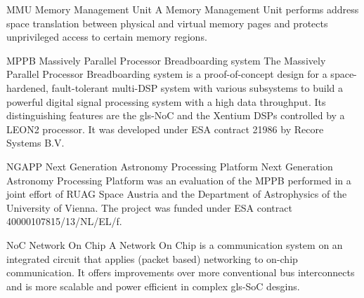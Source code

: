 


%
  {MMU}%
  {Memory Management Unit}%
  {A Memory Management Unit performs address space translation between physical
   and virtual memory pages and protects unprivileged access to certain memory
   regions.}%

%
  {MPPB}%
  {Massively Parallel Processor Breadboarding system}%
  {The Massively Parallel Processor Breadboarding system is a proof-of-concept %
   design for a space-hardened, fault-tolerant multi-DSP system with various %
   subsystems to build a powerful digital signal processing system with a high %
   data throughput. Its distinguishing features are the \gls{gls-NoC} and the
   \gls{Xentium} \glspl{DSP} controlled by a \gls{LEON2} processor.
   It was developed under ESA contract 21986 by Recore Systems B.V.}%


%
  {NGAPP}%
  {Next Generation Astronomy Processing Platform}%
  {Next Generation Astronomy Processing Platform was an evaluation of the
   \gls{MPPB} performed in a joint effort of RUAG Space Austria and the
   Department of Astrophysics of the University of Vienna.
   The project was funded under ESA contract 40000107815/13/NL/EL/f.}%

%
  {NoC}%
  {Network On Chip}%
  {A Network On Chip is a communication system on an integrated circuit that
   applies (packet based) networking to on-chip communication. It offers
   improvements over more conventional bus interconnects and is more scalable
   and power efficient in complex \gls{gls-SoC} desgins.}%

